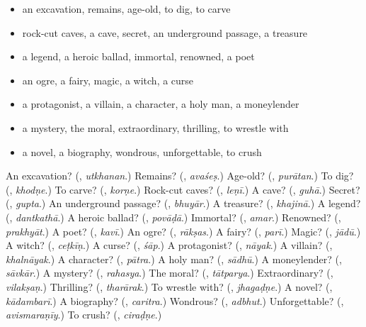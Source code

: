 \begin{itemize}
\raggedright
  \item an excavation, remains, age-old, to dig, to carve
  \item rock-cut caves, a cave, secret, an underground passage, a treasure
  \item a legend, a heroic ballad, immortal, renowned, a poet
  \item an ogre, a fairy, magic, a witch, a curse
  \item a protagonist, a villain, a character, a holy man, a moneylender
  \item a mystery, the moral, extraordinary, thrilling, to wrestle with
  \item a novel, a biography, wondrous, unforgettable, to crush
\end{itemize}

\begin{tcolorbox}[breakable,colback=teal!4,colframe=teal!35!black,title={Before you move on}]
An excavation? (\textbf{}, \emph{utkhanan}.) Remains? (\textbf{}, \emph{avaśeṣ}.) Age-old? (\textbf{}, \emph{purātan}.) To dig? (\textbf{}, \emph{khodṇe}.) To carve? (\textbf{}, \emph{korṇe}.) Rock-cut caves? (\textbf{}, \emph{leṇī}.) A cave? (\textbf{}, \emph{guhā}.) Secret? (\textbf{}, \emph{gupta}.) An underground passage? (\textbf{}, \emph{bhuyār}.) A treasure? (\textbf{}, \emph{khajinā}.) A legend? (\textbf{}, \emph{dantkathā}.) A heroic ballad? (\textbf{}, \emph{povāḍā}.) Immortal? (\textbf{}, \emph{amar}.) Renowned? (\textbf{}, \emph{prakhyāt}.) A poet? (\textbf{}, \emph{kavī}.) An ogre? (\textbf{}, \emph{rākṣas}.) A fairy? (\textbf{}, \emph{parī}.) Magic? (\textbf{}, \emph{jādū}.) A witch? (\textbf{}, \emph{ceṭkīṇ}.) A curse? (\textbf{}, \emph{śāp}.) A protagonist? (\textbf{}, \emph{nāyak}.) A villain? (\textbf{}, \emph{khalnāyak}.) A character? (\textbf{}, \emph{pātra}.) A holy man? (\textbf{}, \emph{sādhū}.) A moneylender? (\textbf{}, \emph{sāvkār}.) A mystery? (\textbf{}, \emph{rahasya}.) The moral? (\textbf{}, \emph{tātparya}.) Extraordinary? (\textbf{}, \emph{vilakṣaṇ}.) Thrilling? (\textbf{}, \emph{tharārak}.) To wrestle with? (\textbf{}, \emph{jhagaḍṇe}.) A novel? (\textbf{}, \emph{kādambarī}.) A biography? (\textbf{}, \emph{caritra}.) Wondrous? (\textbf{}, \emph{adbhut}.) Unforgettable? (\textbf{}, \emph{avismaraṇīy}.) To crush? (\textbf{}, \emph{ciraḍṇe}.)
\end{tcolorbox}

